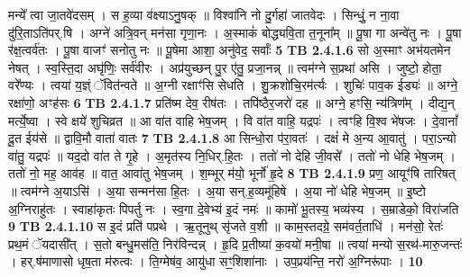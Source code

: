 \documentclass[17pt]{extarticle}
\begin{document}
                  मन्ये᳚ त्वा जा॒तवे॑दसम् । स ह॒व्या व॑क्ष्याऽनु॒षक् ॥ विश्वा॑नि नो दु॒र्गहा॑ जातवेदः । सिन्धुं॒ न ना॒वा दु॑रि॒ताऽति॑पर्.षि । अग्ने॑ अत्रि॒वन् मन॑सा गृणा॒नः । अ॒स्माकं॑ बोद्ध्यवि॒ता त॒नूना᳚म् ॥ पू॒षा गा अन्वे॑तु नः । पू॒षा र॑क्ष॒त्वर्व॑तः । पू॒षा वाजꣳ॑ सनोतु नः ॥ पू॒षेमा आशा॒ अनु॑वेद॒ सर्वाः᳚ \textbf{ 5} \newline
                  \newline
                                \textbf{ TB 2.4.1.6} \newline
                  सो अ॒स्माꣳ अभ॑यतमेन नेषत् । स्व॒स्ति॒दा अघृ॑णिः॒ सर्व॑वीरः । अप्र॑युच्छन् पु॒र ए॑तु॒ प्रजा॒नन्न् ॥ त्वम॑ग्ने स॒प्रथा॑ असि । जुष्टो॒ होता॒ वरे᳚ण्यः । त्वया॑ य॒ज्ञ्ं ॅवित॑न्वते ॥ अ॒ग्नी रक्षाꣳ॑सि सेधति । शु॒क्रशो॑चि॒रम॑र्त्यः । शुचिः॑ पाव॒क ईड्यः॑ ॥ अग्ने॒ रक्षा॑णो॒ अꣳह॑सः \textbf{ 6} \newline
                  \newline
                                \textbf{ TB 2.4.1.7} \newline
                  प्रति॑ष्म देव॒ रीष॑तः । तपि॑ष्ठैर॒जरो॑ दह ॥ अग्ने॒ हꣳसि॒ न्य॑त्रिण᳚म् । दीद्य॒न् मर्त्ये॒ष्वा । स्वे क्षये॑ शुचिव्रत ॥ आ वा॑त वाहि भेष॒जम् । वि वा॑त वाहि॒ यद्रपः॑ । त्वꣳहि वि॒श्व भे॑षजः । दे॒वानां᳚ दू॒त ईय॑से ॥ द्वावि॒मौ वाता॑ वातः \textbf{ 7} \newline
                  \newline
                                \textbf{ TB 2.4.1.8} \newline
                  आ सिन्धो॒रा प॑रा॒वतः॑ । दक्षं॑ मे अ॒न्य आ॒वातु॑ । परा॒ऽन्यो वा॑तु॒ यद्रपः॑ ॥ यद॒दो वा॑त ते गृ॒हे । अ॒मृत॑स्य नि॒धिर्.हि॒तः । ततो॑ नो देहि जी॒वसे᳚ । ततो॑ नो धेहि भेष॒जम् । ततो॑ नो॒ मह॒ आव॑ह ॥ वात॒ आवा॑तु भेष॒जम् । श॒म्भूर् म॑यो॒ भूर्नो॑ हृ॒दे \textbf{ 8} \newline
                  \newline
                                \textbf{ TB 2.4.1.9} \newline
                  प्रण॒ आयूꣳ॑षि तारिषत् ॥ त्वम॑ग्ने अ॒याऽसि॑ । अ॒या सन्मन॑सा हि॒तः । अ॒या सन्.ह॒व्यमू॑हिषे । अ॒या नो॑ धेहि भेष॒जम् ॥ इ॒ष्टो अ॒ग्निराहु॑तः । स्वाहा॑कृतः पिपर्तु नः । स्व॒गा दे॒वेभ्य॑ इ॒दं नमः॑ ॥ कामो॑ भू॒तस्य॒ भव्य॑स्य । स॒म्राडेको॒ विरा॑जति \textbf{ 9} \newline
                  \newline
                                \textbf{ TB 2.4.1.10} \newline
                  स इ॒दं प्रति॑ पप्रथे । ऋ॒तूनुथ् सृ॑जते व॒शी ॥ काम॒स्तदग्रे॒ सम॑वर्त॒ताधि॑ । मन॑सो॒ रेतः॑ प्रथ॒मं ॅयदासी᳚त् । स॒तो बन्धु॒मस॑ति॒ निर॑विन्दन्न् । हृ॒दि प्र॒तीष्या॑ क॒वयो॑ मनी॒षा ॥ त्वया॑ मन्यो स॒रथ॑-मारु॒जन्तः॑ । हर्.ष॑माणासो धृष॒ता म॑रुत्वः । ति॒ग्मेष॑व॒ आयु॑धा सꣳ॒॒शिशा॑नाः । उप॒प्रय॑न्ति॒ नरो॑ अ॒ग्निरू॑पाः । \textbf{ 10} \newline
\end{document}
